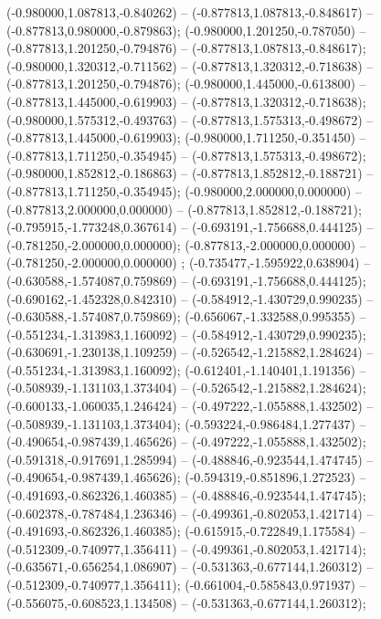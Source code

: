  (-0.980000,1.087813,-0.840262) -- (-0.877813,1.087813,-0.848617) -- (-0.877813,0.980000,-0.879863);
 (-0.980000,1.201250,-0.787050) -- (-0.877813,1.201250,-0.794876) -- (-0.877813,1.087813,-0.848617);
 (-0.980000,1.320312,-0.711562) -- (-0.877813,1.320312,-0.718638) -- (-0.877813,1.201250,-0.794876);
 (-0.980000,1.445000,-0.613800) -- (-0.877813,1.445000,-0.619903) -- (-0.877813,1.320312,-0.718638);
 (-0.980000,1.575312,-0.493763) -- (-0.877813,1.575313,-0.498672) -- (-0.877813,1.445000,-0.619903);
 (-0.980000,1.711250,-0.351450) -- (-0.877813,1.711250,-0.354945) -- (-0.877813,1.575313,-0.498672);
 (-0.980000,1.852812,-0.186863) -- (-0.877813,1.852812,-0.188721) -- (-0.877813,1.711250,-0.354945);
 (-0.980000,2.000000,0.000000) -- (-0.877813,2.000000,0.000000) -- (-0.877813,1.852812,-0.188721);
 (-0.795915,-1.773248,0.367614) -- (-0.693191,-1.756688,0.444125) -- (-0.781250,-2.000000,0.000000);
 (-0.877813,-2.000000,0.000000) -- (-0.781250,-2.000000,0.000000) ;
 (-0.735477,-1.595922,0.638904) -- (-0.630588,-1.574087,0.759869) -- (-0.693191,-1.756688,0.444125);
 (-0.690162,-1.452328,0.842310) -- (-0.584912,-1.430729,0.990235) -- (-0.630588,-1.574087,0.759869);
 (-0.656067,-1.332588,0.995355) -- (-0.551234,-1.313983,1.160092) -- (-0.584912,-1.430729,0.990235);
 (-0.630691,-1.230138,1.109259) -- (-0.526542,-1.215882,1.284624) -- (-0.551234,-1.313983,1.160092);
 (-0.612401,-1.140401,1.191356) -- (-0.508939,-1.131103,1.373404) -- (-0.526542,-1.215882,1.284624);
 (-0.600133,-1.060035,1.246424) -- (-0.497222,-1.055888,1.432502) -- (-0.508939,-1.131103,1.373404);
 (-0.593224,-0.986484,1.277437) -- (-0.490654,-0.987439,1.465626) -- (-0.497222,-1.055888,1.432502);
 (-0.591318,-0.917691,1.285994) -- (-0.488846,-0.923544,1.474745) -- (-0.490654,-0.987439,1.465626);
 (-0.594319,-0.851896,1.272523) -- (-0.491693,-0.862326,1.460385) -- (-0.488846,-0.923544,1.474745);
 (-0.602378,-0.787484,1.236346) -- (-0.499361,-0.802053,1.421714) -- (-0.491693,-0.862326,1.460385);
 (-0.615915,-0.722849,1.175584) -- (-0.512309,-0.740977,1.356411) -- (-0.499361,-0.802053,1.421714);
 (-0.635671,-0.656254,1.086907) -- (-0.531363,-0.677144,1.260312) -- (-0.512309,-0.740977,1.356411);
 (-0.661004,-0.585843,0.971937) -- (-0.556075,-0.608523,1.134508) -- (-0.531363,-0.677144,1.260312);
